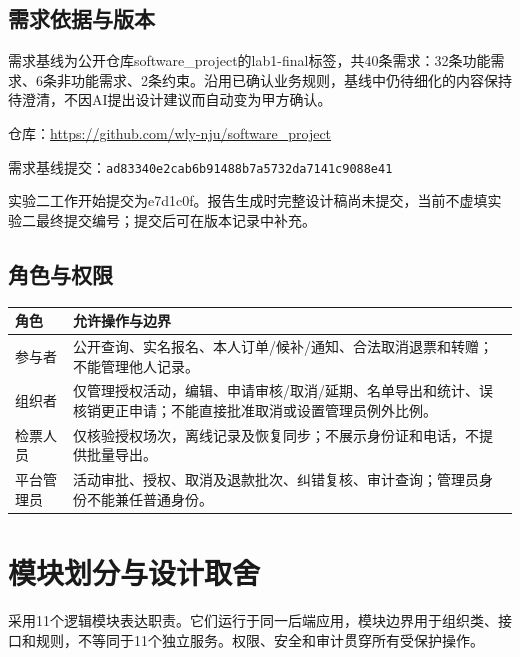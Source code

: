 \documentclass[UTF8,zihao=-4,fontset=windows]{ctexart}
\begin{document}
\subsection{需求依据与版本}
需求基线为公开仓库software\_project的lab1-final标签，共40条需求：32条功能需求、6条非功能需求、2条约束。沿用已确认业务规则，基线中仍待细化的内容保持待澄清，不因AI提出设计建议而自动变为甲方确认。

\noindent 仓库：\url{https://github.com/wly-nju/software_project}\par
\noindent 需求基线提交：\texttt{ad83340e2cab6b91488b7a5732da7141c9088e41}\par
实验二工作开始提交为e7d1c0f。报告生成时完整设计稿尚未提交，当前不虚填实验二最终提交编号；提交后可在版本记录中补充。


\subsection{角色与权限}
\begin{small}
\noindent\begin{tabularx}{\linewidth}{p{24mm}X}
\toprule
角色 & 允许操作与边界 \\ \midrule
参与者 & 公开查询、实名报名、本人订单/候补/通知、合法取消退票和转赠；不能管理他人记录。 \\
组织者 & 仅管理授权活动，编辑、申请审核/取消/延期、名单导出和统计、误核销更正申请；不能直接批准取消或设置管理员例外比例。 \\
检票人员 & 仅核验授权场次，离线记录及恢复同步；不展示身份证和电话，不提供批量导出。 \\
平台管理员 & 活动审批、授权、取消及退款批次、纠错复核、审计查询；管理员身份不能兼任普通身份。 \\
\bottomrule
\end{tabularx}
\end{small}\par\smallskip

\clearpage

\section{模块划分与设计取舍}
采用11个逻辑模块表达职责。它们运行于同一后端应用，模块边界用于组织类、接口和规则，不等同于11个独立服务。权限、安全和审计贯穿所有受保护操作。
\end{document}
